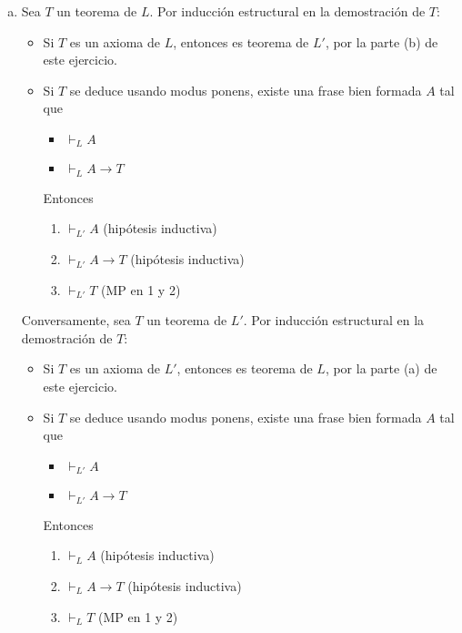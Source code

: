 \begin{solution}
\begin{enumerate}[(a)]
    \item Sea $T$ un teorema de $L$. Por inducción estructural en la demostración de $T$:
    
    \begin{itemize}
        \item Si $T$ es un axioma de $L$, entonces es teorema de $L'$, por la parte (b) de este ejercicio.
        \item Si $T$ se deduce usando modus ponens, existe una frase bien formada $A$ tal que
        \begin{itemize}
            \item $\vdash_L A$
            \item $\vdash_L A \to T$
        \end{itemize}
        
        Entonces
        \begin{enumerate}[1.]
            \item $\vdash_{L'} A$       \hfill (hipótesis inductiva)
            \item $\vdash_{L'} A \to T$ \hfill (hipótesis inductiva)
            \item $\vdash_{L'} T$       \hfill (MP en 1 y 2)
        \end{enumerate}
    \end{itemize}
    
    Conversamente, sea $T$ un teorema de $L'$. Por inducción estructural en la demostración de $T$:
    
    \begin{itemize}
        \item Si $T$ es un axioma de $L'$, entonces es teorema de $L$, por la parte (a) de este ejercicio.
        \item Si $T$ se deduce usando modus ponens, existe una frase bien formada $A$ tal que
        \begin{itemize}
            \item $\vdash_{L'} A$
            \item $\vdash_{L'} A \to T$
        \end{itemize}
        
        Entonces
        \begin{enumerate}[1.]
            \item $\vdash_L A$       \hfill (hipótesis inductiva)
            \item $\vdash_L A \to T$ \hfill (hipótesis inductiva)
            \item $\vdash_L T$       \hfill (MP en 1 y 2)
        \end{enumerate}
    \end{itemize}
\end{enumerate}
\end{solution}

